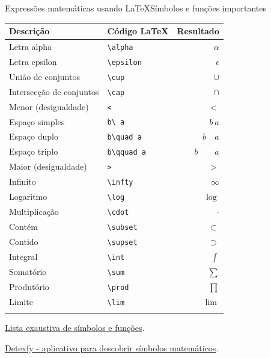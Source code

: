 \documentclass[
  10pt,
  ignorenonframetext,
]{beamer}
\begin{document}
\begin{frame}[fragile]{Expressões matemáticas usando
\LaTeX\newline Símbolos e funções importantes}
\protect\hypertarget{expressuxf5es-matemuxe1ticas-usando-suxedmbolos-e-funuxe7uxf5es-importantes}{}
\scriptsize

\begin{longtable}[]{@{}llr@{}}
\toprule\noalign{}
Descrição & Código \LaTeX & Resultado \\
\midrule\noalign{}
\endhead
Letra alpha & \texttt{\textbackslash{}alpha} & \(\alpha\) \\
Letra epsilon & \texttt{\textbackslash{}epsilon} & \(\epsilon\) \\
União de conjuntos & \texttt{\textbackslash{}cup} & \(\cup\) \\
Intersecção de conjuntos & \texttt{\textbackslash{}cap} & \(\cap\) \\
Menor (desigualdade) & \texttt{\textless{}} & \(<\) \\
Espaço simples & \texttt{b\textbackslash{}\ a} & \(b\ a\) \\
Espaço duplo & \texttt{b\textbackslash{}quad\ a} & \(b\quad a\) \\
Espaço triplo & \texttt{b\textbackslash{}qquad\ a} & \(b\qquad a\) \\
Maior (desigualdade) & \texttt{\textgreater{}} & \(>\) \\
Infinito & \texttt{\textbackslash{}infty} & \(\infty\) \\
Logaritmo & \texttt{\textbackslash{}log} & \(\log\) \\
Multiplicação & \texttt{\textbackslash{}cdot} & \(\cdot\) \\
Contém & \texttt{\textbackslash{}subset} & \(\subset\) \\
Contido & \texttt{\textbackslash{}supset} & \(\supset\) \\
Integral & \texttt{\textbackslash{}int} & \(\int\) \\
Somatório & \texttt{\textbackslash{}sum} & \(\sum\) \\
Produtório & \texttt{\textbackslash{}prod} & \(\prod\) \\
Limite & \texttt{\textbackslash{}lim} & \(\lim\) \\
\bottomrule\noalign{}
\end{longtable}

\normalsize

\href{https://en.wikibooks.org/wiki/LaTeX/Mathematics\#Symbols}{Lista
exaustiva de símbolos e funções}.

\href{https://detexify.kirelabs.org/classify.html}{Detexfy - aplicativo
para descobrir símbolos matemáticos}.
\end{frame}
\end{document}
